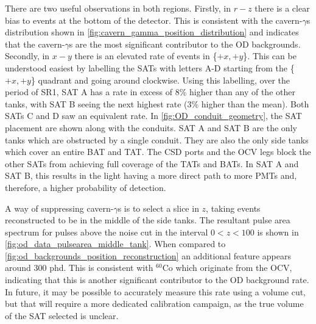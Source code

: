 

\par
There are two useful observations in both regions.
Firstly, in $r-z$ there is a clear bias to events at the bottom of the detector.
This is consistent with the cavern-$\gamma$s distribution shown in \autoref{fig:cavern_gamma_position_distribution} and indicates that the cavern-$\gamma$s are the most significant contributor to the OD backgrounds.
Secondly, in $x-y$ there is an elevated rate of events in \{$+x,+y$\}.
This can be understood easiest by labelling the SATs with letters A-D starting from the \{$+x,+y$\} quadrant and going around clockwise.
Using this labelling, over the period of SR1, SAT A has a rate in excess of 8\% higher than any of the other tanks, with SAT B seeing the next highest rate (3\% higher than the mean).
Both SATs C and D saw an equivalent rate.
In \autoref{fig:OD_conduit_geometry}, the SAT placement are shown along with the conduits.
SAT A and SAT B are the only tanks which are obstructed by a single conduit.
They are also the only side tanks which cover an entire BAT and TAT.
The CSD ports and the OCV legs block the other SATs from achieving full coverage of the TATs and BATs.
In SAT A and SAT B, this results in the light having a more direct path to more PMTs and, therefore, a higher probability of detection.
\par
A way of suppressing cavern-$\gamma$s is to select a slice in $z$, taking events reconstructed to be in the middle of the side tanks.
The resultant pulse area spectrum for pulses above the noise cut in the interval $0<z<100$ is shown in \autoref{fig:od_data_pulsearea_middle_tank}.
When compared to \autoref{fig:od_backgrounds_position_reconstruction} an additional feature appears around 300 phd.
This is consistent with ${}^{60}$Co which originate from the OCV, indicating that this is another significant contributor to the OD background rate.
In future, it may be possible to accurately measure this rate using a volume cut, but that will require a more dedicated calibration campaign, as the true volume of the SAT selected is unclear.

